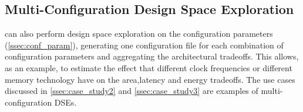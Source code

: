 \subsection{Multi-Configuration Design Space Exploration}
\frameworkname can also perform design space exploration on the configuration parameters (\ref{ssec:conf_param}), generating one configuration file for each combination of configuration parameters and aggregating the architectural tradeoffs. This allows, as an example, to estimate the effect that different clock frequencies or different memory technology have on the area,latency and energy tradeoffs. The use cases discussed in \ref{ssec:case_study2} and \ref{ssec:case_study3} are examples of multi-configuration DSEs.
%
%

